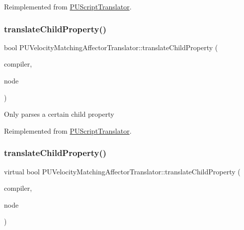 Reimplemented from \hyperlink{classPUScriptTranslator_ab587d01348ae3e678cb700c719b2b113}{P\+U\+Script\+Translator}.

\mbox{\label{classPUVelocityMatchingAffectorTranslator_af11c56b0553d77c8a2489e3882974b57}} 
\subsubsection{\texorpdfstring{translate\+Child\+Property()}{translateChildProperty()}\hspace{0.1cm}{\footnotesize\ttfamily [1/2]}}
{\footnotesize\ttfamily bool P\+U\+Velocity\+Matching\+Affector\+Translator\+::translate\+Child\+Property (\begin{DoxyParamCaption}\item[{\hyperlink{classPUScriptCompiler}{P\+U\+Script\+Compiler} $\ast$}]{compiler,  }\item[{\hyperlink{classPUAbstractNode}{P\+U\+Abstract\+Node} $\ast$}]{node }\end{DoxyParamCaption})\hspace{0.3cm}{\ttfamily [virtual]}}

Only parses a certain child property 

Reimplemented from \hyperlink{classPUScriptTranslator_a0374d83a8a04e57918975d525e0f8fe8}{P\+U\+Script\+Translator}.

\mbox{\label{classPUVelocityMatchingAffectorTranslator_a715b98cd9a1bf636600f65303277d715}} 
\subsubsection{\texorpdfstring{translate\+Child\+Property()}{translateChildProperty()}\hspace{0.1cm}{\footnotesize\ttfamily [2/2]}}
{\footnotesize\ttfamily virtual bool P\+U\+Velocity\+Matching\+Affector\+Translator\+::translate\+Child\+Property (\begin{DoxyParamCaption}\item[{\hyperlink{classPUScriptCompiler}{P\+U\+Script\+Compiler} $\ast$}]{compiler,  }\item[{\hyperlink{classPUAbstractNode}{P\+U\+Abstract\+Node} $\ast$}]{node }\end{DoxyParamCaption})\hspace{0.3cm}{\ttfamily [virtual]}}

